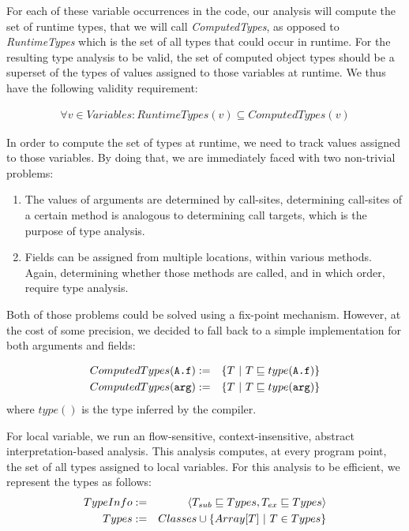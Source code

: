 For each of these variable occurrences in the code, our analysis will compute
the set of runtime types, that we will call \emph{ComputedTypes}, as opposed to
\emph{RuntimeTypes} which is the set of all types that could occur in runtime.
For the resulting type analysis to be valid, the set of computed object types
should be a superset of the types of values assigned to those variables at
runtime.  We thus have the following validity requirement:

\begin{eqnarray*}
    \forall v \in Variables: RuntimeTypes(v) \subseteq ComputedTypes(v)
\end{eqnarray*}

In order to compute the set of types at runtime, we need to track values
assigned to those variables. By doing that, we are immediately faced with two
non-trivial problems:
\begin{enumerate}
    \item The values of arguments are determined by call-sites, determining
    call-sites of a certain method is analogous to determining call targets,
    which is the purpose of type analysis.

    \item Fields can be assigned from multiple locations, within various
    methods. Again, determining whether those methods are
    called, and in which order, require type analysis.
\end{enumerate}

Both of those problems could be solved using a fix-point mechanism. However, at
the cost of some precision, we decided to fall back to a simple implementation
for both arguments and fields:

\begin{eqnarray*}
    ComputedTypes(\verb/A.f/) &:=& \{ T ~|~ T \subtypeeq type(\verb/A.f/) \} \\
    ComputedTypes(\verb/arg/) &:=& \{ T ~|~ T \subtypeeq type(\verb/arg/) \} \\
\end{eqnarray*}
where $type()$ is the type inferred by the compiler.

For local variable, we run an flow-sensitive, context-insensitive, abstract
interpretation-based analysis. This analysis computes, at every program point,
the set of all types assigned to local variables. For this analysis to be
efficient, we represent the types as follows:
\begin{eqnarray*}
    TypeInfo &:=& \langle T_{sub} \sqsubseteq Types, T_{ex} \sqsubseteq Types\rangle \\
    Types    &:=& Classes \cup \{ Array[T] ~|~ T \in Types \} \\
\end{eqnarray*}

